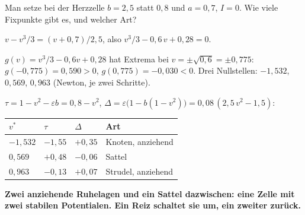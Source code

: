 \begin{aufgabe}
Man setze bei der Herzzelle $b = 2{,}5$ statt $0{,}8$ und $a = 0{,}7$, $I = 0$. Wie viele Fixpunkte gibt es, und welcher Art?

\loesung
{}
$v - v^{3}/3 = (v+0{,}7)/2{,}5$, also $v^{3}/3 - 0{,}6\,v + 0{,}28 = 0$.

$g(v) = v^{3}/3 - 0{,}6v + 0{,}28$ hat Extrema bei $v = \pm\sqrt{0{,}6} = \pm0{,}775$: $g(-0{,}775) = 0{,}590 > 0$, $g(0{,}775) = -0{,}030 < 0$. Drei Nullstellen: $-1{,}532$, $0{,}569$, $0{,}963$ (Newton, je zwei Schritte).

$\tau = 1 - v^{2} - \varepsilon b = 0{,}8 - v^{2}$, $\Delta = \varepsilon\big(1 - b(1-v^{2})\big) = 0{,}08\,(2{,}5\,v^{2} - 1{,}5)$:
\begin{center}
{\small
\renewcommand{\arraystretch}{1.48}
\begin{tabular}{@{}P{1.6cm}P{1.6cm}P{1.6cm}P{3.2cm}@{}}
\toprule
$v^{*}$ & $\tau$ & $\Delta$ & \textbf{Art}\\
\midrule
$-1{,}532$ & $-1{,}55$ & $+0{,}35$ & Knoten, anziehend\\
$0{,}569$ & $+0{,}48$ & $-0{,}06$ & Sattel\\
$0{,}963$ & $-0{,}13$ & $+0{,}07$ & Strudel, anziehend\\
\bottomrule
\end{tabular}}
\end{center}

\begin{center}
\begin{minipage}{0.9\textwidth}
\textbf{Zwei anziehende Ruhelagen und ein Sattel dazwischen: eine Zelle mit zwei stabilen Potentialen. Ein Reiz schaltet sie um, ein zweiter zurück.}
\end{minipage}
\end{center}

\begin{center}
\begin{minipage}{0.88\textwidth}
\end{minipage}
\end{center}
\end{aufgabe}

